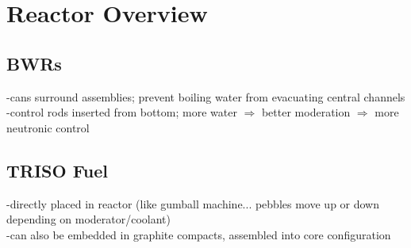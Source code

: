 \documentclass{report}
\newcommand{\h}[1]{\section*{#1}}
\newcommand{\hh}[1]{\subsection*{#1}}
\begin{document}
\h{Reactor Overview}

\hh{BWRs}

-cans surround assemblies; prevent boiling water from evacuating central channels\\
-control rods inserted from bottom; more water $\Rightarrow$ better moderation $\Rightarrow$ more neutronic control \\

\hh{TRISO Fuel}

-directly placed in reactor (like gumball machine... pebbles move up or down depending on moderator/coolant) \\
-can also be embedded in graphite compacts, assembled into core configuration
\end{document}
